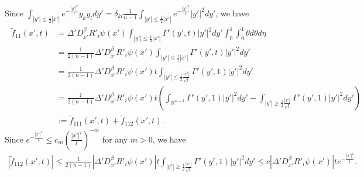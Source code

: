\documentclass{amsart}
\numberwithin{equation}{section}
\newcommand{\bke}[1]{\left( #1 \right)}
\newcommand {\be}{\beta}
\newcommand{\Rn}{{\mathbb R}^{n-1}}
\newcommand{\De}{\Delta}
\newcommand{\te}{\theta}
\newcommand{\de}{\delta}
\newcommand{\Ga}{\Gamma}
\begin{document}
Since $
\int_{|y'| \leq \frac12 |x'|}  e^{-\frac{|y'|^2}t} y_k y_l dy'
  = \de_{kl}   \frac1{n-1} \int_{|y'| \leq \frac12 |x'|}  e^{-\frac{|y'|^2}t}   |y'|^2 dy'$, 
we have 
\begin{align*}
\begin{split}
 \tilde f_{11}(x',t) %
& =  \De'      D_{x'}^\be   R'_i \psi (x'  )       \int_{|y'| \leq \frac12 |x'|} \Ga'( y',t)  |y'|^2 dy' \int_0^1 \int_0^1 \te d\te d\eta   \\
& = \frac1{2(n-1)}   \De'      D_{x'}^\be   R'_i \psi (x'  )  \int_{|y'| \leq \frac12 |x'|}   \Ga'(y',t) | y'|^2 dy'\\
& =  \frac1{2(n-1)}   \De'   D_{x'}^\be     R'_i \psi (x'  )   t  \int_{|y'| \leq \frac12\frac{ |x'|}{\sqrt{t}}} \Ga'( y',1)   | y'|^2   dy'\\
&=\frac1{2(n-1)}   \De'   D_{x'}^\be     R'_i \psi (x'  )   t  \bke{\int_{\Rn }\Ga'( y',1)   | y'|^2   dy' -\int_{|y'| \geq \frac12\frac{ |x'|}{\sqrt{t}}} \Ga'( y',1)   | y'|^2   dy'}\\
& := \tilde f_{111}(x',t) + \tilde f_{112}(x',t).
\end{split}
\end{align*}
Since  $  e^{-\frac{|x'|^2}t} \leq c_m ( \frac{|x'|^2}t )^{-m}$ for  any $m > 0$, we have 
\begin{align*}
| \tilde f_{112}(x',t)| \leq  \frac1{2(n-1)} | \De'    D_{x'}^\be   R'_i \psi (x'  ) | t \int_{|y'| \geq \frac12\frac{ |x'|}{\sqrt{t}}} \Ga'( y',1)   | y'|^2   dy'
\leq   c    | \De'    D_{x'}^\be   R'_i \psi (x'  ) |  t   e^{-\frac{|x'|^2}t}.
\end{align*}
\end{document}
